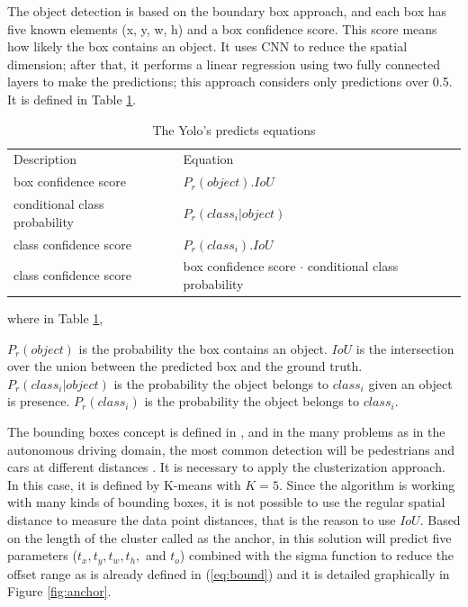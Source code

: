 The object detection is based on the boundary box approach, and each box has five known elements (x, y, w, h) and a box confidence score. This score means how likely the box contains an object. It uses CNN to reduce the spatial dimension; after that, it performs a linear regression using two fully connected layers to make the predictions; this approach considers only predictions over 0.5. It is defined in Table \ref{eq:prob_yolo}. 


\begin{table}[H]
\centering
\caption{The Yolo's predicts equations}
\begin{tabular}{l|l} 
\toprule
Description~                   & Equation                                                                 \\
box confidence score           & $P_r(object).IoU$                                                     \\
conditional class probability~ & $P_r(class_i|object)$                                       \\
class confidence score         & $P_r(class_i).IoU$                                                   \\
class confidence score         & box confidence score $\cdot$ conditional class probability  \\
\bottomrule
\end{tabular}
\label{eq:prob_yolo}
\end{table}

where in Table \ref{eq:prob_yolo}, 

$P_r(object)$ is the probability the box contains an object.
$IoU$ is the intersection over the union between the predicted box and the ground truth.
$P_r(class_i|object)$ is the probability the object belongs to $class_i$ given an object is presence.
$P_r(class_i)$ is the probability the object belongs to $class_i$.

The bounding boxes concept is defined in \cite{redmon2017yolo9000}, and in the many problems as in the autonomous driving domain, the most common detection will be pedestrians and cars at different distances \cite{ess2010object}.  It is necessary to apply the clusterization approach. In this case, it is defined by K-means with $K=5$. Since the algorithm is working with many kinds of bounding boxes, it is not possible to use the regular spatial distance to measure the data point distances, that is the reason to use $IoU$. Based on the length of the cluster called as the anchor, in this solution will predict five parameters ($t_x, t_y, t_w, t_h,$ and $t_o$) combined with the sigma function to reduce the offset range as is already defined in (\ref{eq:bound}) and it is detailed graphically in Figure \ref{fig:anchor}.


